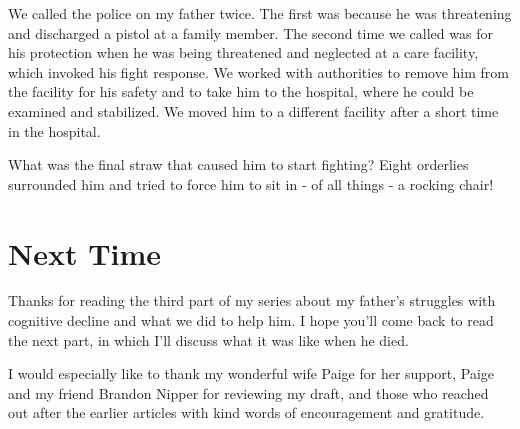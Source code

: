 \documentclass{article}
\begin{document}
We called the police on my father twice. The first was because he was threatening and discharged a pistol at a family member. The second time we called was for his protection when he was being threatened and neglected at a care facility, which invoked his fight response. We worked with authorities to remove him from the facility for his safety and to take him to the hospital, where he could be examined and stabilized. We moved him to a different facility after a short time in the hospital.

What was the final straw that caused him to start fighting? Eight orderlies surrounded him and tried to force him to sit in - of all things - a rocking chair!

\section*{Next Time}

Thanks for reading the third part of my series about my father’s struggles with cognitive decline and what we did to help him. I hope you’ll come back to read the next part, in which I'll discuss what it was like when he died.

I would especially like to thank my wonderful wife Paige for her support, Paige and my friend Brandon Nipper for reviewing my draft, and those who reached out after the earlier articles with kind words of encouragement and gratitude. 
\end{document}
